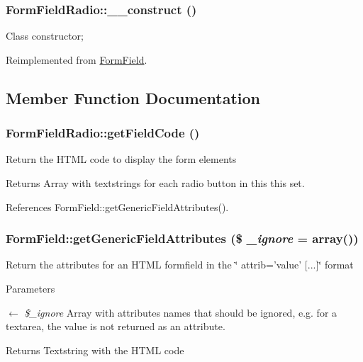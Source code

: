\subsubsection[{\_\-\_\-construct}]{\setlength{\rightskip}{0pt plus 5cm}FormFieldRadio::\_\-\_\-construct ()}\label{classFormFieldRadio_ae82224cf68e3513e29923c24f42eb06d}
Class constructor; 

Reimplemented from \hyperlink{classFormField_a0cfe713ce28a6a0cb53476ed463e1f01}{FormField}.



\subsection{Member Function Documentation}
\subsubsection[{getFieldCode}]{\setlength{\rightskip}{0pt plus 5cm}FormFieldRadio::getFieldCode ()}\label{classFormFieldRadio_a727e6c7c77ed0e2b49108d0e44c6e8d3}
Return the HTML code to display the form elements

\begin{DoxyReturn}{Returns}
Array with textstrings for each radio button in this this set. 
\end{DoxyReturn}


References FormField::getGenericFieldAttributes().

\subsubsection[{getGenericFieldAttributes}]{\setlength{\rightskip}{0pt plus 5cm}FormField::getGenericFieldAttributes (\$ {\em \_\-ignore} = {\ttfamily array()})}\label{classFormField_a9f9d136ba8b4a793f22370aff43d592d}
Return the attributes for an HTML formfield in the \char`\"{} attrib='value' \mbox{[}...\mbox{]}\char`\"{} format


\begin{DoxyParams}{Parameters}
\item[\mbox{$\leftarrow$} {\em \$\_\-ignore}]Array with attributes names that should be ignored, e.g. for a textarea, the value is not returned as an attribute. \end{DoxyParams}
\begin{DoxyReturn}{Returns}
Textstring with the HTML code 
\end{DoxyReturn}


